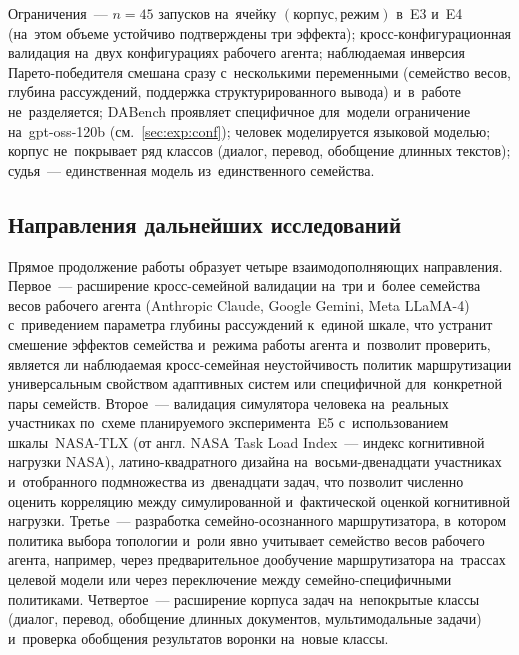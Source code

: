 Ограничения~--- $n=45$ запусков на~ячейку $(\text{корпус},\text{режим})$
в~E3 и~E4 (на~этом объеме устойчиво подтверждены три эффекта);
кросс-конфигурационная валидация на~двух конфигурациях рабочего агента;
наблюдаемая инверсия Парето-победителя смешана сразу с~несколькими
переменными (семейство весов, глубина рассуждений, поддержка
структурированного вывода) и~в~работе не~разделяется; DABench
проявляет специфичное для~модели ограничение на~gpt-oss-120b
(см.~\ref{sec:exp:conf}); человек моделируется языковой моделью;
корпус не~покрывает ряд классов (диалог, перевод, обобщение длинных
текстов); судья~--- единственная модель из~единственного семейства.

\subsection*{Направления дальнейших исследований}

Прямое продолжение работы образует четыре взаимодополняющих направления.
Первое~--- расширение кросс-семейной валидации на~три и~более семейства
весов рабочего агента (Anthropic Claude, Google Gemini, Meta LLaMA-4)
с~приведением параметра глубины рассуждений к~единой шкале, что устранит
смешение эффектов семейства и~режима работы агента и~позволит проверить,
является ли наблюдаемая кросс-семейная неустойчивость политик
маршрутизации универсальным свойством адаптивных систем или специфичной
для~конкретной пары семейств. Второе~--- валидация симулятора человека
на~реальных участниках по~схеме планируемого эксперимента~E5
с~использованием шкалы~NASA-TLX (от англ. NASA Task Load Index~---
индекс когнитивной нагрузки NASA), латино-квадратного дизайна
на~восьми-двенадцати участниках и~отобранного подмножества
из~двенадцати задач, что позволит численно оценить корреляцию между
симулированной и~фактической оценкой когнитивной нагрузки.
Третье~--- разработка семейно-осознанного маршрутизатора, в~котором
политика выбора топологии и~роли явно учитывает семейство весов
рабочего агента, например, через предварительное дообучение
маршрутизатора на~трассах целевой модели или через переключение между
семейно-специфичными политиками. Четвертое~--- расширение корпуса
задач на~непокрытые классы (диалог, перевод, обобщение длинных
документов, мультимодальные задачи) и~проверка обобщения результатов
воронки на~новые классы.
